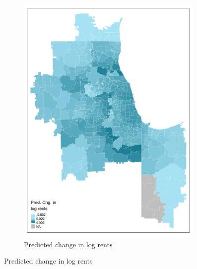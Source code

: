 \documentclass[aspectratio=169, t]{beamer}
\begin{document}
\begin{frame}[label = example_pred_chi_07_2019]
\begin{figure}
\begin{subfigure}{0.33\textwidth}
                         \includegraphics[width = 0.99\textwidth]{prediction_events/output/chicago_2019-7_hatfe_d_ln_rents_baseline.png}
			\caption*{Predicted change in log rents}
		\end{subfigure}
	\end{figure}
	
	\hyperlink{static_tab}{}
\end{frame}
\end{document}
